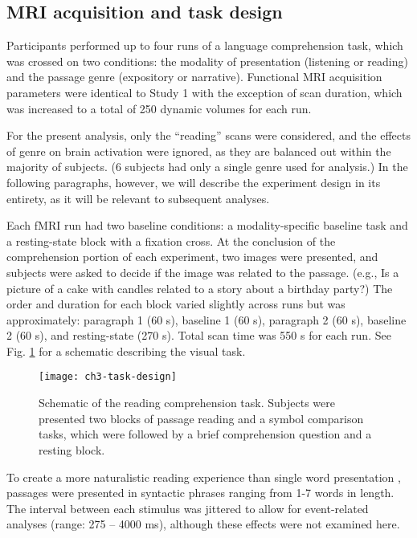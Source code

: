 \subsection{MRI acquisition and task design}

Participants performed up to four runs of a language comprehension task, which was crossed on two conditions: the modality of presentation (listening or reading) and the passage genre (expository or narrative). Functional MRI acquisition parameters were identical to Study 1 with the exception of scan duration, which was increased to a total of 250 dynamic volumes for each run. 

For the present analysis, only the ``reading'' scans were considered, and the effects of genre on brain activation were ignored, as they are balanced out within the majority of subjects. (6 subjects had only a single genre used for analysis.) In the following paragraphs, however, we will describe the experiment design in its entirety, as it will be relevant to subsequent analyses.

Each fMRI run had two baseline conditions: a modality-specific baseline task and a resting-state block with a fixation cross. At the conclusion of the comprehension portion of each experiment, two images were presented, and subjects were asked to decide if the image was related to the passage. (e.g., Is a picture of a cake with candles related to a story about a birthday party?) The order and duration for each block varied slightly across runs but was approximately: paragraph 1 (60 s), baseline 1 (60 s), paragraph 2 (60 s), baseline 2 (60 s), and resting-state (270 s). Total scan time was 550 s for each run. See Fig. \ref{fig:ch3-task-design} for a schematic describing the visual task.

\begin{figure}[t]
	\centering
	\texttt{[image: ch3-task-design]}
	\caption[Schematic of the reading comprehension task.]{Schematic of the reading comprehension task. Subjects were presented two blocks of passage reading and a symbol comparison tasks, which were followed by a brief comprehension question and a resting block.}
	\label{fig:ch3-task-design}
\end{figure}

To create a more naturalistic reading experience than single word presentation \citep{Rayner1998}, passages were presented in syntactic phrases ranging from 1-7 words in length. The interval between each stimulus was jittered to allow for event-related analyses (range: 275 – 4000 ms), although these effects were not examined here.


